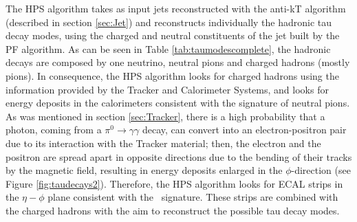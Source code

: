  The HPS algorithm takes as input jets reconstructed with the anti-kT algorithm 
 (described in section \ref{sec:Jet}) and reconstructs individually the 
 hadronic tau decay modes, using the charged and neutral constituents of the jet 
 built by the PF algorithm. As can be seen in Table \ref{tab:taumodescomplete}, the 
 hadronic decays are composed by one neutrino, neutral pions and charged hadrons (mostly pions).
 In consequence, the HPS algorithm looks for charged hadrons  using the information 
 provided by the Tracker and Calorimeter Systems, and looks for energy deposits 
 in the calorimeters consistent with the signature of neutral pions. As was mentioned 
 in section \ref{sec:Tracker}, there is a high probability that a photon, coming from a 
  $\pi^{0} \rightarrow \gamma\gamma$ decay, can convert into 
  an electron-positron pair due to its interaction
 with the Tracker material; then, the electron and the positron 
 are  spread apart in opposite directions due to the bending of their tracks by 
 the magnetic field, resulting in energy deposits 
 enlarged in the $\phi$-direction (see Figure \ref{fig:taudecays2}). Therefore, 
 the HPS algorithm looks for ECAL strips in the $\eta-\phi$ plane 
 consistent with the \picero~signature. These strips are combined 
 with the charged hadrons with the aim to reconstruct 
 the possible tau decay modes. \\
 
